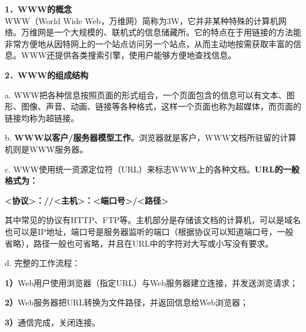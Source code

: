 \textbf{{1．WWW的概念}}\\

WWW（World Wide
Web，万维网）简称为3W，它并非某种特殊的计算机网络。万维网是一个大规模的、联机式的信息储藏所。它的特点在于用链接的方法能非常方便地从因特网上的一个站点访问另一个站点，从而主动地按需获取丰富的信息。WWW还提供各类搜索引擎，使用户能够方便地查找信息。

\textbf{{2．WWW的组成结构}}

a.
WWW把各种信息按照页面的形式组合，一个页面包含的信息可以有文本、图形、图像、声音、动画、链接等各种格式，这样一个页面也称为超媒体，而页面的链接均称为超链接。

{{b.
}\textbf{WWW以客户/服务器模型工作}}。浏览器就是客户，WWW文档所驻留的计算机则是WWW服务器。

c.
WWW使用统一资源定位符（URL）来标志WWW上的各种文档。\textbf{URL的一般格式为：}

\textbf{\textless{}协议\textgreater{}：//\textless{}主机\textgreater{}：\textless{}端口号\textgreater{}/\textless{}路径\textgreater{}}

其中常见的协议有HTTP、FTP等。主机部分是存储该文档的计算机，可以是域名也可以是IP地址，端口号是服务器监听的端口（根据协议可以知道端口号，一般省略），路径一般也可省略，并且在URL中的字符对大写或小写没有要求。

{d. 完整的工作流程：}

\textbf{1）}Web用户使用浏览器（指定URL）与Web服务器建立连接，并发送浏览请求；

\textbf{2）}Web服务器把URL转换为文件路径，并返回信息给Web浏览器；

\textbf{3）}通信完成，关闭连接。

